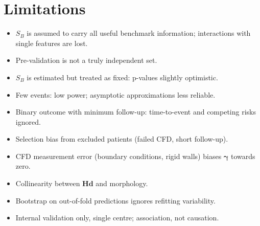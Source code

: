 \section{Limitations}
\label{sec:p1-limits}
\begin{itemize}
    \item $S_B$ is assumed to carry all useful benchmark information; interactions with single features are lost.
    \item Pre-validation is not a truly independent set.
    \item $S_B$ is estimated but treated as fixed: p-values slightly optimistic.
    \item Few events: low power; asymptotic approximations less reliable.
    \item Binary outcome with minimum follow-up: time-to-event and competing risks ignored.
    \item Selection bias from excluded patients (failed CFD, short follow-up).
    \item CFD measurement error (boundary conditions, rigid walls) biases $\boldsymbol{\gamma}$ towards zero.
    \item Collinearity between $\mathbf{Hd}$ and morphology.
    \item Bootstrap on out-of-fold predictions ignores refitting variability.
    \item Internal validation only, single centre; association, not causation.
\end{itemize}
